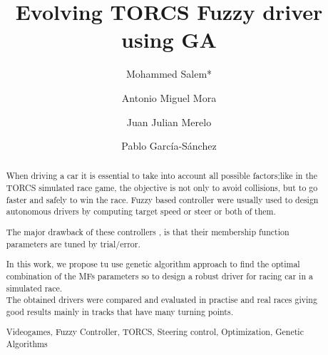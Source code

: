 \documentclass[runningheads,a4paper]{llncs}
\newcommand{\keywords}[1]{\par\addvspace\baselineskip
	\noindent\keywordname\enspace\ignorespaces#1}
\begin{document}
	
	\mainmatter  %
	
	\title{Evolving TORCS Fuzzy driver using GA}
	
	
	
	
	
	
	\author{Mohammed Salem*  \and Antonio Miguel Mora \and Juan Julian Merelo  \and Pablo Garc\'ia-S\'anchez }
	
	
	
	
	
	
	\tocauthor{}
	\maketitle
	\begin{abstract}
		
		When driving a car it is essential to take into account all possible
		factors;like in the TORCS simulated race game, the
		objective is not only to avoid collisions, but to go faster and safely to win the race. Fuzzy based controller were usually used to design autonomous drivers by computing target speed or steer or both of them.
		
		The major drawback of these controllers , is that their membership function parameters are tuned by trial/error.
		
		In this work, we propose tu use genetic algorithm approach to find the optimal combination of the MFs parameters so to design a robust driver for racing car in a simulated race.\\
		The obtained drivers were compared and  evaluated in practise and real races
		giving good results mainly in tracks that have many turning points.
	\keywords{Videogames, Fuzzy Controller, TORCS, Steering control, Optimization, Genetic Algorithms}
	\end{abstract}
	
\end{document}

